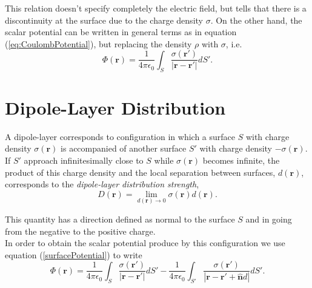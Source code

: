 This relation doesn't specify completely the electric field, but tells that there is a discontinuity at the surface due to the charge density $\sigma$. On the other hand, the scalar potential can be written in general terms as in equation (\ref{eq:CoulombPotential}), but replacing the density $\rho$ with $\sigma$, i.e.
\begin{equation}
\Phi (\textbf{r}) =  \frac{1}{4\pi \epsilon_0}  \int_S   \frac{\sigma (\textbf{r}') }{\left| \textbf{r} - \textbf{r}' \right| }  dS'.
\label{surfacePotential}
\end{equation}

\section{Dipole-Layer Distribution}

A dipole-layer corresponds to configuration in which a surface $S$ with charge density $\sigma(\textbf{r})$ is accompanied of another surface $S'$ with charge density $-\sigma(\textbf{r})$. If $S'$ approach infinitesimally close to $S$ while $\sigma(\textbf{r})$ becomes infinite, the product of this charge density and the local separation between surfaces, $d(\textbf{r})$, corresponds to the \textit{dipole-layer distribution strength},
\begin{equation}
D(\textbf{r}) = \lim_{d(\textbf{r}) \rightarrow 0 } \sigma(\textbf{r}) d(\textbf{r}).
\end{equation}

This quantity has a direction defined as normal to the surface $S$ and in going from the negative to the positive charge.\\
In order to obtain the scalar potential produce by this configuration we use equation (\ref{surfacePotential}) to write
\begin{equation}
\Phi (\textbf{r}) =  \frac{1}{4\pi \epsilon_0}  \int _S  \frac{\sigma (\textbf{r}') }{\left| \textbf{r} - \textbf{r}' \right| }  dS'- \frac{1}{4\pi \epsilon_0}  \int_{S'}   \frac{\sigma (\textbf{r}') }{\left| \textbf{r} - \textbf{r}' + \hat{\textbf{n}} d \right| }  dS'.
\end{equation}

